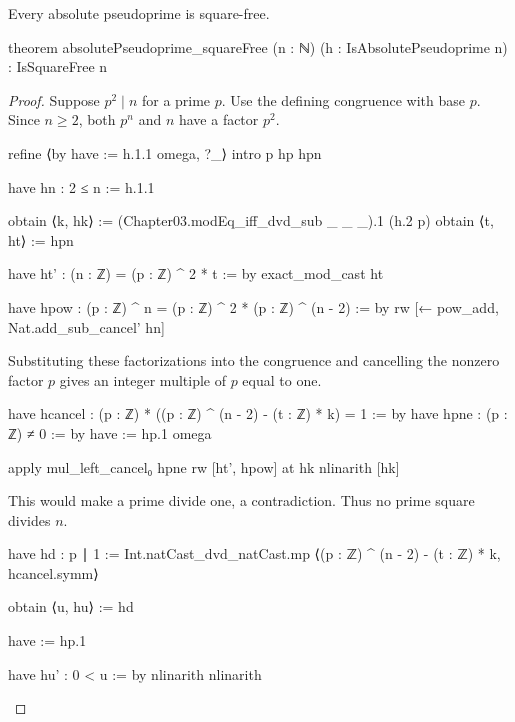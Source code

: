 \begin{theorem}
  \label{ent:thm:absolutepseudoprime-squarefree}
  Every absolute pseudoprime is square-free.

  \begin{lean}
    theorem absolutePseudoprime_squareFree (n : ℕ) (h : IsAbsolutePseudoprime n) :
        IsSquareFree n
  \end{lean}
\end{theorem}

\begin{proof}
  Suppose $p^2\mid n$ for a prime $p$.
  Use the defining congruence with base $p$.
  Since $n\ge2$, both $p^n$ and $n$ have a factor $p^2$.

  \begin{lean}
    refine ⟨by
        have := h.1.1
        omega, ?_⟩
    intro p hp hpn

    have hn : 2 ≤ n := h.1.1

    obtain ⟨k, hk⟩ := (Chapter03.modEq_iff_dvd_sub _ _ _).1 (h.2 p)
    obtain ⟨t, ht⟩ := hpn

    have ht' : (n : ℤ) = (p : ℤ) ^ 2 * t := by
      exact_mod_cast ht

    have hpow : (p : ℤ) ^ n = (p : ℤ) ^ 2 * (p : ℤ) ^ (n - 2) := by
      rw [← pow_add, Nat.add_sub_cancel' hn]
  \end{lean}

  Substituting these factorizations into the congruence and cancelling the nonzero factor $p$
  gives an integer multiple of $p$ equal to one.

  \begin{lean}
    have hcancel : (p : ℤ) * ((p : ℤ) ^ (n - 2) - (t : ℤ) * k) = 1 := by
      have hpne : (p : ℤ) ≠ 0 := by
        have := hp.1
        omega

      apply mul_left_cancel₀ hpne
      rw [ht', hpow] at hk
      nlinarith [hk]
  \end{lean}

  This would make a prime divide one, a contradiction.
  Thus no prime square divides $n$.

  \begin{lean}
    have hd : p ∣ 1 := Int.natCast_dvd_natCast.mp
      ⟨(p : ℤ) ^ (n - 2) - (t : ℤ) * k, hcancel.symm⟩

    obtain ⟨u, hu⟩ := hd

    have := hp.1

    have hu' : 0 < u := by
      nlinarith
    nlinarith
  \end{lean}
\end{proof}
